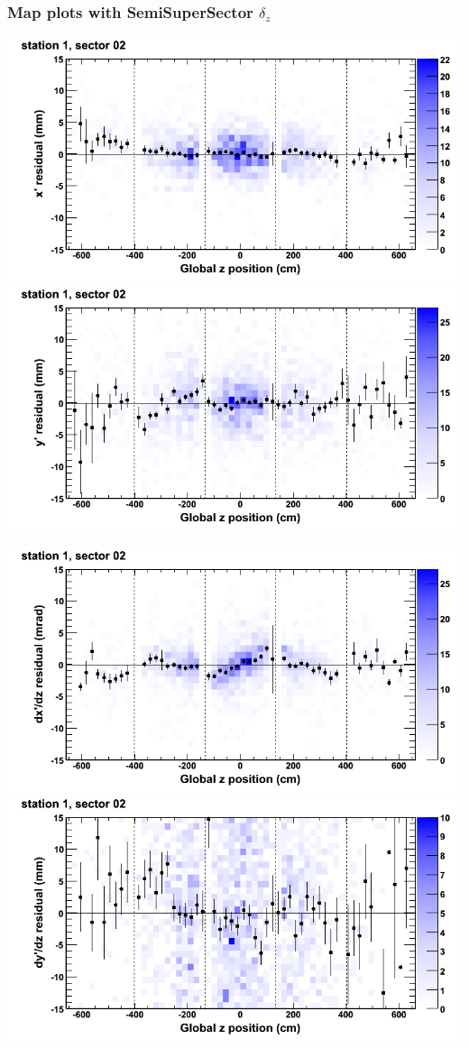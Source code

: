\documentclass[compress]{beamer}
\begin{document}
\begin{frame}
\frametitle{Map plots with SemiSuperSector $\delta_z$}
\includegraphics[width=0.5\linewidth]{zfit_mapplots/DTvsz_st1sec02_x.png}
\includegraphics[width=0.5\linewidth]{zfit_mapplots/DTvsz_st1sec02_y.png}

\includegraphics[width=0.5\linewidth]{zfit_mapplots/DTvsz_st1sec02_dxdz.png}
\includegraphics[width=0.5\linewidth]{zfit_mapplots/DTvsz_st1sec02_dydz.png}
\end{frame}
\end{document}

